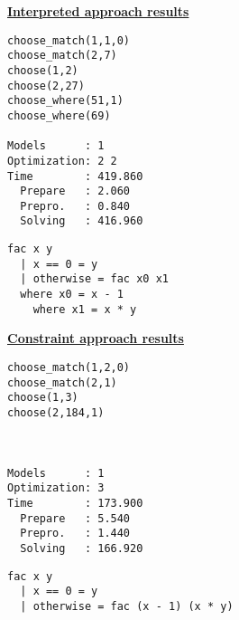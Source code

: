\begin{multicols*}{2}
\underline{\textbf{Interpreted approach results}}
\begin{lstlisting}
choose_match(1,1,0)
choose_match(2,7)
choose(1,2) 
choose(2,27) 
choose_where(51,1)
choose_where(69) 

Models      : 1     
Optimization: 2 2 
Time        : 419.860
  Prepare   : 2.060
  Prepro.   : 0.840
  Solving   : 416.960
\end{lstlisting}

\begin{lstlisting}
fac x y
  | x == 0 = y
  | otherwise = fac x0 x1
  where x0 = x - 1
  	where x1 = x * y
\end{lstlisting}
\vfill
\columnbreak
\underline{\textbf{Constraint approach results}}
\begin{lstlisting}
choose_match(1,2,0)
choose_match(2,1) 
choose(1,3) 
choose(2,184,1) 

 
 
Models      : 1     
Optimization: 3 
Time        : 173.900
  Prepare   : 5.540
  Prepro.   : 1.440
  Solving   : 166.920

\end{lstlisting}
\begin{lstlisting}
fac x y
  | x == 0 = y
  | otherwise = fac (x - 1) (x * y)
\end{lstlisting}
\end{multicols*}
\pagebreak
